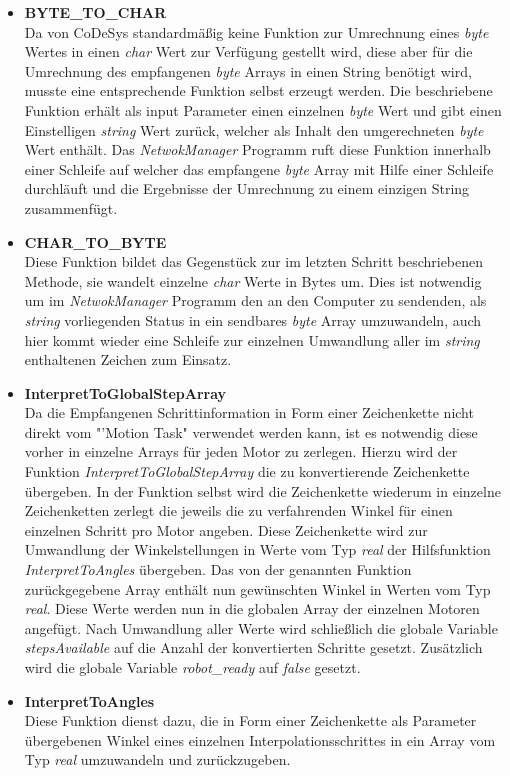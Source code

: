 \begin{itemize}
\item \textbf{BYTE\_TO\_CHAR}\\
Da von CoDeSys standardmäßig keine Funktion zur Umrechnung eines \textit{byte} Wertes in einen \textit{char} Wert zur Verfügung gestellt wird, diese aber für die Umrechnung des empfangenen \textit{byte} Arrays in einen String benötigt wird, musste eine entsprechende Funktion selbst erzeugt werden. Die beschriebene Funktion erhält als input Parameter einen einzelnen \textit{byte} Wert und gibt einen Einstelligen \textit{string} Wert zurück, welcher als Inhalt den umgerechneten \textit{byte} Wert enthält. Das \textit{NetwokManager} Programm ruft diese Funktion innerhalb einer Schleife auf welcher das empfangene \textit{byte} Array mit Hilfe einer Schleife durchläuft und die Ergebnisse der Umrechnung zu einem einzigen String zusammenfügt.

\item \textbf{CHAR\_TO\_BYTE}\\
Diese Funktion bildet das Gegenstück zur im letzten Schritt beschriebenen Methode, sie wandelt einzelne \textit{char} Werte in Bytes um. Dies ist notwendig um im \textit{NetwokManager} Programm den an den Computer zu sendenden, als \textit{string} vorliegenden Status  in ein sendbares \textit{byte} Array umzuwandeln, auch hier kommt wieder eine Schleife zur einzelnen Umwandlung aller im \textit{string} enthaltenen Zeichen zum Einsatz.

\item \textbf{InterpretToGlobalStepArray}\\
Da die Empfangenen Schrittinformation in Form einer Zeichenkette nicht direkt vom "'Motion Task" verwendet werden kann, ist es notwendig diese vorher in einzelne Arrays für jeden Motor zu zerlegen. Hierzu wird der Funktion \textit{InterpretToGlobalStepArray} die zu konvertierende Zeichenkette übergeben. In der Funktion selbst wird die Zeichenkette wiederum in einzelne Zeichenketten zerlegt die jeweils die zu verfahrenden Winkel für einen einzelnen Schritt pro Motor angeben. Diese Zeichenkette wird zur Umwandlung der Winkelstellungen in Werte vom Typ \textit{real} der Hilfsfunktion \textit{InterpretToAngles} übergeben. Das von der genannten Funktion zurückgegebene Array enthält nun gewünschten Winkel in Werten vom Typ \textit{real}. Diese Werte werden nun in die globalen Array der einzelnen Motoren angefügt. Nach Umwandlung aller Werte wird schließlich die globale Variable \textit{stepsAvailable} auf die Anzahl der konvertierten Schritte gesetzt. Zusätzlich wird die globale Variable \textit{robot\_ready} auf \textit{false} gesetzt.

\item \textbf{InterpretToAngles}\\
Diese Funktion dienst dazu, die in Form einer Zeichenkette als Parameter übergebenen Winkel eines einzelnen Interpolationsschrittes in ein Array vom Typ \textit{real} umzuwandeln und zurückzugeben.

\end{itemize}

